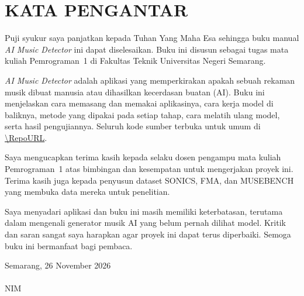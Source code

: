 \chapter*{KATA PENGANTAR}

Puji syukur saya panjatkan kepada Tuhan Yang Maha Esa sehingga buku manual \textit{AI Music Detector} ini dapat diselesaikan. Buku ini disusun sebagai tugas mata kuliah Pemrograman~1 di Fakultas Teknik Universitas Negeri Semarang.

\textit{AI Music Detector} adalah aplikasi yang memperkirakan apakah sebuah rekaman musik dibuat manusia atau dihasilkan kecerdasan buatan (AI). Buku ini menjelaskan cara memasang dan memakai aplikasinya, cara kerja model di baliknya, metode yang dipakai pada setiap tahap, cara melatih ulang model, serta hasil pengujiannya. Seluruh kode sumber terbuka untuk umum di \url{\RepoURL}.

Saya mengucapkan terima kasih kepada \DosenPengampu{} selaku dosen pengampu mata kuliah Pemrograman~1 atas bimbingan dan kesempatan untuk mengerjakan proyek ini. Terima kasih juga kepada penyusun dataset SONICS, FMA, dan MUSEBENCH yang membuka data mereka untuk penelitian.

Saya menyadari aplikasi dan buku ini masih memiliki keterbatasan, terutama dalam mengenali generator musik AI yang belum pernah dilihat model. Kritik dan saran sangat saya harapkan agar proyek ini dapat terus diperbaiki. Semoga buku ini bermanfaat bagi pembaca.

\vspace{0.7cm}
\begin{flushright}
Semarang, 26 November 2026\\[1.6cm]
\NamaPenulis\\
NIM \NIMPenulis
\end{flushright}

